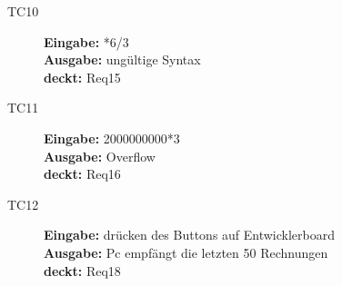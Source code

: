 \begin{description}
 \item[TC10] \textbf{Eingabe:} *6/3\\
  \textbf{Ausgabe:} ungültige Syntax\\
  \textbf{deckt:} Req15

 \item[TC11] \textbf{Eingabe:} 2000000000*3\\
  \textbf{Ausgabe:} Overflow\\
  \textbf{deckt:} Req16

 \item[TC12] \textbf{Eingabe:} drücken des Buttons auf Entwicklerboard\\
  \textbf{Ausgabe:} Pc empfängt die letzten 50 Rechnungen\\
  \textbf{deckt:} Req18

\end{description}
